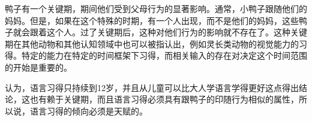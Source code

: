 鸭子有一个关键期，期间他们受到父母行为的显著影响。通常，小鸭子跟随他们的妈妈。但是，如果在这个特殊的时期，有一个人出现，而不是他们的妈妈，这些鸭子就会跟着这个人。过了关键期后，这种对他们行为的影响就不存在了\citep{Lorenz70a-u}。这种关键期在其他动物和其他认知领域中也可以被指认出，例如灵长类动物的视觉能力的习得。特定的能力在特定的时间框架下习得，而相关输入的存在对决定这个时间范围的开始是重要的。

 \citet{Lenneberg64a}认为，语言习得只持续到12岁，并且从儿童可以比大人学语言学得更好这点得出结论，这也有赖于关键期，而且语言习得必须具有跟鸭子的印随行为相似的属性，所以说，语言习得的倾向必须是天赋的\citep[\S~4]{Lenneberg67a-u}。

